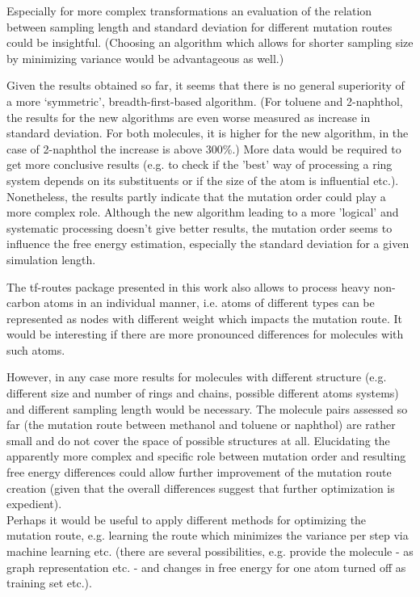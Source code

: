 Especially for more complex transformations an evaluation of the relation between sampling length and standard deviation for different mutation routes could be insightful. (Choosing an algorithm which allows for shorter sampling size by minimizing variance would be advantageous as well.)

Given the results obtained so far, it seems that there is no general superiority of a more ‘symmetric’, breadth-first-based algorithm. (For toluene and 2-naphthol, the results for the new algorithms are even worse measured as increase in standard deviation. For both molecules, it is higher for the new algorithm, in the case of 2-naphthol the increase is above 300\%.) More data would be required to get more conclusive results (e.g. to check if the 'best' way of processing a ring system depends on its substituents or if the size of the atom is influential etc.). Nonetheless, the results partly indicate that the mutation order could play a more complex role. Although the new algorithm leading to a more 'logical' and systematic processing doesn't give better results, the mutation order seems to influence the free energy estimation, especially the standard deviation for a given simulation length.

The tf-routes package presented in this work also allows to process heavy non-carbon atoms in an individual manner, i.e. atoms of different types can be represented as nodes with different weight which impacts the mutation route. It would be interesting if there are more pronounced differences for molecules with such atoms.

However, in any case more results for molecules with different structure (e.g. different size and number of rings and chains, possible different atoms systems) and different sampling length would be necessary. The molecule pairs assessed so far (the mutation route between methanol and toluene or naphthol) are rather small and do not cover the space of possible structures at all.
Elucidating the apparently more complex and specific role between mutation order and resulting free energy differences could allow further improvement of the mutation route creation (given that the overall differences suggest that further optimization is expedient).\\
Perhaps it would be useful to apply different methods for optimizing the mutation route, e.g. learning the route which minimizes the variance per step via machine learning etc. (there are several possibilities, e.g. provide the molecule - as graph representation etc. - and changes in free energy for one atom turned off as training set etc.).

